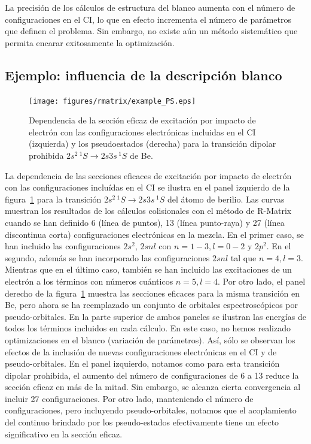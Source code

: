 La precisión de los cálculos de estructura del blanco aumenta con el número de 
configuraciones en el CI, lo que en efecto incrementa el número de 
parámetros que definen el problema. Sin embargo, no existe aún un método 
sistemático que permita encarar exitosamente la optimización.



\newpage
\subsection{Ejemplo: influencia de la descripción blanco}
\begin{figure}[t]
\centering
\texttt{[image: figures/rmatrix/example\_PS.eps]}
\caption[Dependencia de la sección eficaz de excitación con las 
configuraciones electrónicas y los pseudoestados.]
{Dependencia de la sección eficaz de excitación por impacto de
electrón con las configuraciones electrónicas incluidas en el CI 
(izquierda) y los pseudoestados (derecha) para la transición dipolar 
prohibida $2s^2\,^1S \rightarrow 2s3s\,^1S$ de Be.}
\label{fig:dependencia-CI}
\end{figure}

La dependencia de las secciones eficaces de excitación por impacto de 
electrón con las configuraciones incluídas en el CI se ilustra en el 
panel izquierdo de la figura~\ref{fig:dependencia-CI} para la transición 
$2s^2\,^1S\rightarrow 2s3s\,^1S$ del átomo de berilio. Las curvas 
muestran los resultados de los cálculos colisionales con el método de 
R-Matrix cuando se han definido 6 (línea de puntos), 13 (línea 
punto-raya) y 27 (línea discontinua corta) configuraciones electrónicas 
en la mezcla. En el primer caso, se han incluido las configuraciones 
$2s^2$, $2snl$ con $n=1-3,l=0-2$ y $2p^2$. En el segundo, además se han 
incorporado las configuraciones $2snl$ tal que $n=4,l=3$. Mientras que en 
el último caso, también se han incluido las excitaciones de un electrón a 
los términos con números cuánticos $n=5,l=4$. Por otro lado, el panel 
derecho de la figura~\ref{fig:dependencia-CI} muestra las secciones 
eficaces para la misma transición en Be, pero ahora se ha reemplazado un 
conjunto de orbitales espectroscópicos por pseudo-orbitales. En la parte 
superior de ambos paneles se ilustran las energías de todos los términos 
incluidos en cada cálculo. En este caso, no hemos realizado 
optimizaciones en el blanco (variación de parámetros). Así, sólo se 
observan los efectos de la inclusión de nuevas configuraciones 
electrónicas en el CI y de pseudo-orbitales. En el panel izquierdo, 
notamos como para esta transición dipolar prohibida, el aumento del 
número de configuraciones de 6 a 13 reduce la sección eficaz en más de la 
mitad. Sin embargo, se alcanza cierta convergencia al incluir 27 
configuraciones. Por otro lado, manteniendo el número de configuraciones,
pero incluyendo pseudo-orbitales, notamos que el acoplamiento del 
continuo brindado por los pseudo-estados efectivamente tiene un efecto 
significativo en la sección eficaz.

